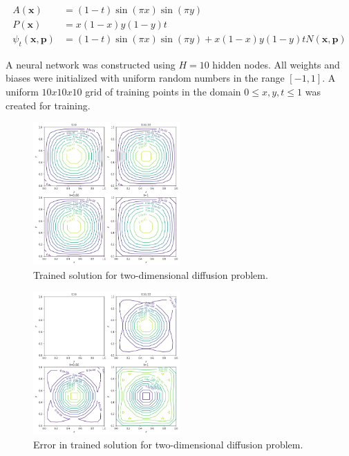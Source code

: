 \documentclass{article}
\begin{document}
\begin{equation}
\begin{split}
  A(\mathbf x) &= (1 - t)\sin(\pi x) \sin(\pi y) \\
  P(\mathbf x) &= x(1 - x)y(1 - y)t \\
  \psi_t(\mathbf x,\mathbf p) &= (1 - t)\sin(\pi x) \sin(\pi y) + x(1 - x)y(1 - y)t N(\mathbf x,\mathbf p)
\end{split}
\end{equation}

A neural network was constructed using $H=10$ hidden nodes. All weights and biases were initialized with uniform random numbers in the range $[-1,1]$. A uniform $10x10x10$ grid of training points in the domain $0 \leq x,y,t \leq 1$ was created for training.

\begin{figure}
\centering
\includegraphics[width=0.5\textwidth]{figures/diff2d_trained.png}
\caption{Trained solution for two-dimensional diffusion problem.}
\label{fig:diff2d_trained}
\end{figure}

\begin{figure}
\centering
\includegraphics[width=0.5\textwidth]{figures/diff2d_error.png}
\caption{Error in trained solution for two-dimensional diffusion problem.}
\label{fig:diff2d_error}
\end{figure}
\end{document}
